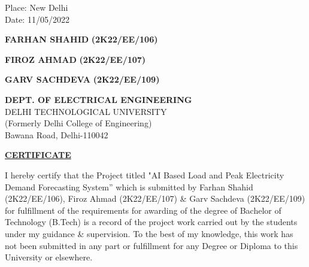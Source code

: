 \documentclass[12pt,a4paper]{report}
\begin{document}
\noindent \begin{minipage}{4cm}
\begin{flushleft}
\vspace{5 cm}
                         
Place: New Delhi\\
Date: 11/05/2022\\

\end{flushleft} 
\end{minipage}
\hfill
\begin{minipage}{12cm}
\begin{flushright}                                      
\vspace{5 cm}
\begin{multicols}{3}
\vspace{1cm}
\textbf{FARHAN SHAHID}
\vspace{0.2cm}
\textbf{(2K22/EE/106)}\\
\vspace{0.2cm}

\vspace{1cm}
\textbf{FIROZ AHMAD}
\vspace{0.2cm}
\textbf{(2K22/EE/107)}\\
\vspace{0.2cm}

\vspace{1cm}
\textbf{GARV SACHDEVA}
\vspace{0.2cm}
\textbf{(2K22/EE/109)}\\
\vspace{0.2cm}
\end{multicols}


\end{flushright} 
\end{minipage}


\newpage


\begin{center}
\textbf{DEPT. OF ELECTRICAL ENGINEERING}\\

DELHI TECHNOLOGICAL UNIVERSITY \\
(Formerly Delhi College of Engineering) \\
Bawana Road, Delhi-110042\\
\end{center}

\vspace{2cm}
\begin{center}
 \textbf{\underline {CERTIFICATE}}
\end{center}
I hereby certify that the Project titled "AI Based Load and Peak Electricity Demand Forecasting System” which is submitted by Farhan Shahid (2K22/EE/106), Firoz Ahmad (2K22/EE/107) \& Garv Sachdeva (2K22/EE/109) for fulfillment of the requirements for awarding of the degree of Bachelor of Technology (B.Tech) is a record of the project work carried out by the students under my guidance \& supervision. To the best of my knowledge, this work has not been submitted in any part or fulfillment for any Degree or Diploma to this University or elsewhere.
\end{document}
